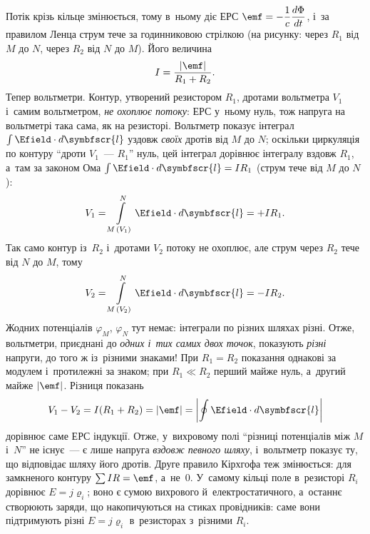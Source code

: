 Потік крізь кільце змінюється, тому в~ньому діє ЕРС $\emf=-\dfrac1c\dfrac{d\Phi}{dt}$, і~за правилом Ленца струм тече за годинниковою стрілкою (на рисунку: через
$R_1$ від $M$ до $N$, через $R_2$ від $N$ до $M$). Його величина
\begin{equation*}
	I=\frac{|\emf|}{R_1+R_2}.
\end{equation*}
Тепер вольтметри. Контур, утворений резистором $R_1$, дротами вольтметра $V_1$ і~самим вольтметром, \emph{не охоплює потоку}: ЕРС у~ньому нуль,
тож напруга на вольтметрі така сама, як на резисторі. Вольтметр показує інтеграл $\int\Efield\cdot d\symbfscr{l}$ уздовж \emph{своїх} дротів від $M$ до $N$;
оскільки циркуляція по контуру \enquote{дроти $V_1$~--- $R_1$} нуль, цей інтеграл дорівнює інтегралу вздовж $R_1$, а~там за законом Ома $\int\Efield\cdot d\symbfscr{l}=IR_1$
(струм тече від $M$ до $N$):
\begin{equation*}
	V_1 = \int\limits_{M\,(V_1)}^{N}\Efield\cdot d\symbfscr{l} = +IR_1 .
\end{equation*}
Так само контур із~$R_2$ і~дротами $V_2$ потоку не охоплює, але струм через $R_2$ тече від $N$ до $M$, тому
\begin{equation*}
	V_2 = \int\limits_{M\,(V_2)}^{N}\Efield\cdot d\symbfscr{l} = -IR_2 .
\end{equation*}
Жодних потенціалів $\varphi_M$, $\varphi_N$ тут немає: інтеграли по різних шляхах різні.
Отже, вольтметри, приєднані до \emph{одних і~тих самих двох точок}, показують \emph{різні} напруги, до того ж із~різними знаками! При $R_1=R_2$ показання однакові за модулем
і~протилежні за знаком; при $R_1\ll R_2$ перший майже нуль, а~другий майже $|\emf|$. Різниця показань
\begin{equation*}
	V_1-V_2=I(R_1+R_2)=|\emf|=\left|\oint\Efield\cdot d\symbfscr{l}\right|
\end{equation*}
дорівнює саме ЕРС індукції. Отже, у~вихровому полі \enquote{різниці потенціалів між $M$ і~$N$} не існує~--- є лише напруга \emph{вздовж певного шляху}, і~вольтметр показує ту, що відповідає шляху його дротів.
Друге правило Кірхгофа теж змінюється: для замкненого контуру $\sum IR=\emf$, а~не~$0$. У~самому кільці поле в~резисторі $R_i$ дорівнює $E=j\varrho_i$; воно є сумою вихрового
й~електростатичного, а~останнє створюють заряди, що накопичуються на стиках провідників: саме вони підтримують різні $E=j\varrho_i$ в~резисторах з~різними $R_i$.

